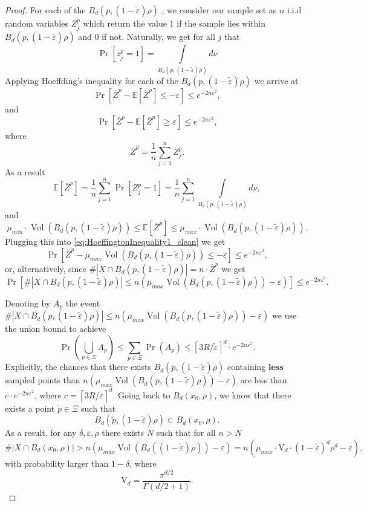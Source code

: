\documentclass[12pt]{article}
\theoremstyle{remark}
\newcommand{\EE}{\mathbb{E}}
\newcommand{\eps}{\varepsilon}
\newcommand{\ceil}[1]{\left\lceil #1 \right\rceil}
\DeclareMathOperator{\vol}{Vol}
\begin{document}
\begin{appendices}
\begin{proof}
For each of the $B_d(p, (1-\tilde\eps)\rho)$ , we  consider our sample set as $n$ i.i.d random variables   $Z^p_j$ which return the value $1$ if the sample lies within $B_d(p, (1-\tilde\eps)\rho)$ and $0$ if not.
Naturally, we get for all $j$ that
\[
\Pr[z_j^p = 1] = \int\limits_{B_d(p, (1-\tilde\eps)\rho)} d\nu 
\] 
Applying Hoeffding's inequality for each of the $B_d(p, (1 - \tilde\eps)\rho)$ we arrive at
\begin{equation}\label{eq:HoeffingtonInequality1_clean}
\Pr[\overline{Z}^p - \EE[\overline{Z}^p] \leq -\eps] \leq e^{-2 n \eps^2}
,    
\end{equation}
and
\begin{equation}\label{eq:HoeffingtonInequality2_clean}
\Pr[\overline{Z}^p - \EE[\overline{Z}^p] \geq \eps] \leq e^{-2 n \eps^2}
,    
\end{equation}
where
\[
\overline{Z}^p = \frac{1}{n}\sum_{j=1}^n Z_j^p.
\]
As a result
\[
\EE[\overline{Z}^p] = \frac{1}{n}\sum_{j=1}^n\Pr[Z_j^p = 1] =
\frac{1}{n}\sum_{j=1}^n\int\limits_{B_d(p, (1 - \tilde\eps)\rho)}d\nu
,\]
and
\begin{equation}\label{eq:EzBounds_clean}
\mu_{min} \cdot \vol(B_d(p, (1 - \tilde\eps)\rho)) \leq \EE[\overline{Z}^p] \leq \mu_{max} \cdot \vol(B_d(p, (1 - \tilde\eps)\rho))
.\end{equation}
Plugging this into \eqref{eq:HoeffingtonInequality1_clean} we get
\begin{equation}\label{eq:PrBound1_clean}
\Pr\left[\overline{Z}^p - \mu_{max}\vol\left(B_d(p, (1- \tilde\eps)\rho)\right)\leq -\eps\right] \leq e^{-2n \eps^2}
,\end{equation}
or, alternatively, since $\#|X \cap B_d(p,(1-\tilde\eps)\rho)| = n \cdot \overline{Z}^p$ we get
\[
\Pr\left[\#|X \cap B_d(p,(1-\tilde\eps)\rho)| \leq n(\mu_{max}\vol(B_d(p,(1-\tilde\eps)\rho))-\eps)\right]\leq e^{-2n \eps^2}
.\]

Denoting by $A_p$ the event $\#|X \cap B_d(p,(1-\tilde\eps)\rho)| \leq n(\mu_{max}\vol(B_d(p,(1-\tilde\eps)\rho))-\eps)$ we use the union bound to achieve 
\begin{equation}\label{eq:UnionBoundAp_clean}
\Pr\left(\bigcup\limits_{p\in\Xi} A_p\right) \leq \sum\limits_{p\in\Xi} \Pr\left(A_p \right) \leq \ceil{ 3R/\tilde\eps}^d \cdot  e^{-2n \eps^2}
.\end{equation}
Explicitly, the chances that there exists $B_d(p,(1-\tilde\eps)\rho)$ containing \textbf{less} sampled points than $n(\mu_{max}\vol(B_d(p,(1-\tilde\eps)\rho))-\eps)$ are less than $c \cdot e^{-2n \eps^2}$, where $c = \ceil{ 3R/\tilde\eps}^d$.
Going back to $B_d(x_0, \rho)$, we know that there exists a point $\tilde p\in \Xi$ such that 
\[
B_d(\tilde p,(1-\tilde\eps)\rho)\subset B_d(x_0, \rho)
.\]
As a result, for any $\delta, \eps, \rho$ there exists $N$ such that for all $n>N$
\[
\#|X \cap B_d(x_0, \rho)| > n(\mu_{max}\vol(B_d((1-\tilde\eps)\rho))-\eps)
= n(\mu_{max}\cdot \mathrm{V}_d \cdot(1-\tilde\eps)^d\rho^d-\eps)
,\]
with probability larger than $1-\delta$, where
\[
\mathrm{V}_d = \frac{\pi^{d/2}}{\Gamma(d/2+1)}
.\]


\end{proof}
\end{appendices}
\end{document}
